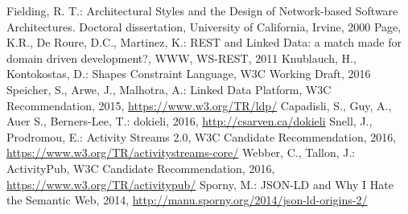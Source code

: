 \documentclass[a4paper]{llncs}
\begin{document}
\begin{thebibliography}{99}
   Fielding, R. T.: Architectural Styles and the Design of Network-based Software Architectures. Doctoral dissertation, University of California, Irvine, 2000%
   Page, K.R., De Roure, D.C., Martinez, K.: REST and Linked Data: a match made for domain driven development?, WWW, WS-REST, 2011%
   Knublauch, H., Kontokostas, D.: Shapes Constraint Language, W3C Working Draft, 2016
   Speicher, S., Arwe, J., Malhotra, A.: Linked Data Platform, W3C Recommendation, 2015, \url{https://www.w3.org/TR/ldp/}
   Capadisli, S., Guy, A., Auer S., Berners-Lee, T.: dokieli, 2016, \url{http://csarven.ca/dokieli}
   Snell, J., Prodromou, E.: Activity Streams 2.0, W3C Candidate Recommendation, 2016, \url{https://www.w3.org/TR/activitystreams-core/}
   Webber, C., Tallon, J.: ActivityPub, W3C Candidate Recommendation, 2016, \url{https://www.w3.org/TR/activitypub/}
   Sporny, M.: JSON-LD and Why I Hate the Semantic Web, 2014, \url{http://manu.sporny.org/2014/json-ld-origins-2/}
\end{thebibliography}
\end{document}
